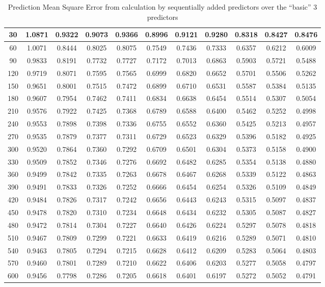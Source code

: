 \begin{table}[h!]
{\begin{tabular}{||c c c c c c c c c c c||}
30 & 1.0871 & 0.9322 & 0.9073 & 0.9366 & 0.8996 & 0.9121 & 0.9280 & 0.8318 & 0.8427 & 0.8476 \\ \hline
        60 & 1.0071 & 0.8444 & 0.8025 & 0.8075 & 0.7549 & 0.7436 & 0.7333 & 0.6357 & 0.6212 & 0.6009 \\ \hline
        90 & 0.9833 & 0.8191 & 0.7732 & 0.7727 & 0.7172 & 0.7013 & 0.6863 & 0.5903 & 0.5721 & 0.5488 \\ \hline
        120 & 0.9719 & 0.8071 & 0.7595 & 0.7565 & 0.6999 & 0.6820 & 0.6652 & 0.5701 & 0.5506 & 0.5262 \\ \hline
        150 & 0.9651 & 0.8001 & 0.7515 & 0.7472 & 0.6899 & 0.6710 & 0.6531 & 0.5587 & 0.5384 & 0.5135 \\ \hline
        180 & 0.9607 & 0.7954 & 0.7462 & 0.7411 & 0.6834 & 0.6638 & 0.6454 & 0.5514 & 0.5307 & 0.5054 \\ \hline
        210 & 0.9576 & 0.7922 & 0.7425 & 0.7368 & 0.6789 & 0.6588 & 0.6400 & 0.5462 & 0.5252 & 0.4998 \\ \hline
        240 & 0.9553 & 0.7898 & 0.7398 & 0.7336 & 0.6755 & 0.6552 & 0.6360 & 0.5425 & 0.5213 & 0.4957 \\ \hline
        270 & 0.9535 & 0.7879 & 0.7377 & 0.7311 & 0.6729 & 0.6523 & 0.6329 & 0.5396 & 0.5182 & 0.4925 \\ \hline
        300 & 0.9520 & 0.7864 & 0.7360 & 0.7292 & 0.6709 & 0.6501 & 0.6304 & 0.5373 & 0.5158 & 0.4900 \\ \hline
        330 & 0.9509 & 0.7852 & 0.7346 & 0.7276 & 0.6692 & 0.6482 & 0.6285 & 0.5354 & 0.5138 & 0.4880 \\ \hline
        360 & 0.9499 & 0.7842 & 0.7335 & 0.7263 & 0.6678 & 0.6467 & 0.6268 & 0.5339 & 0.5122 & 0.4863 \\ \hline
        390 & 0.9491 & 0.7833 & 0.7326 & 0.7252 & 0.6666 & 0.6454 & 0.6254 & 0.5326 & 0.5109 & 0.4849 \\ \hline
        420 & 0.9484 & 0.7826 & 0.7317 & 0.7242 & 0.6656 & 0.6443 & 0.6243 & 0.5315 & 0.5097 & 0.4837 \\ \hline
        450 & 0.9478 & 0.7820 & 0.7310 & 0.7234 & 0.6648 & 0.6434 & 0.6232 & 0.5305 & 0.5087 & 0.4827 \\ \hline
        480 & 0.9472 & 0.7814 & 0.7304 & 0.7227 & 0.6640 & 0.6426 & 0.6224 & 0.5297 & 0.5078 & 0.4818 \\ \hline
        510 & 0.9467 & 0.7809 & 0.7299 & 0.7221 & 0.6633 & 0.6419 & 0.6216 & 0.5289 & 0.5071 & 0.4810 \\ \hline
        540 & 0.9463 & 0.7805 & 0.7294 & 0.7215 & 0.6628 & 0.6412 & 0.6209 & 0.5283 & 0.5064 & 0.4803 \\ \hline
        570 & 0.9460 & 0.7801 & 0.7289 & 0.7210 & 0.6622 & 0.6406 & 0.6203 & 0.5277 & 0.5058 & 0.4797 \\ \hline
        600 & 0.9456 & 0.7798 & 0.7286 & 0.7205 & 0.6618 & 0.6401 & 0.6197 & 0.5272 & 0.5052 & 0.4791 \\ \hline  
\hline
\end{tabular}}
\caption{Prediction Mean Square Error from calculation by sequentially added predictors over the “basic” 3 predictors}
\label{table:PMSEcalcu}
\end{table}


